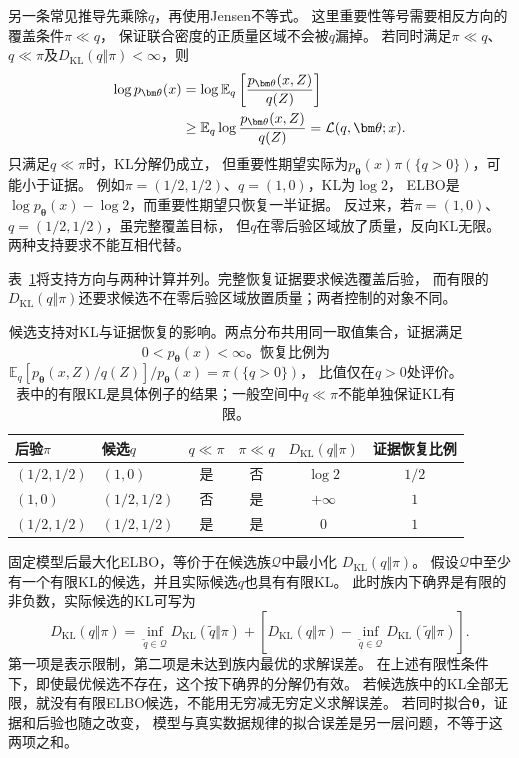另一条常见推导先乘除\(q\)，再使用Jensen不等式。
这里重要性等号需要相反方向的覆盖条件\(\pi\ll q\)，
保证联合密度的正质量区域不会被\(q\)漏掉。
若同时满足\(\pi\ll q\)、\(q\ll\pi\)及\(D_{\mathrm{KL}}(q\Vert\pi)<\infty\)，则
\begin{align}
  \log p_{\bm\theta}(x)
  &=\log\mathbb E_q\left[\frac{p_{\bm\theta}(x,Z)}{q(Z)}\right]\notag\\
  &\geq\mathbb E_q\log\frac{p_{\bm\theta}(x,Z)}{q(Z)}
   =\mathcal L(q,\bm\theta;x).
  \label{eq:information-elbo-jensen}
\end{align}
只满足\(q\ll\pi\)时，KL分解仍成立，
但重要性期望实际为\(p_{\bm\theta}(x)\pi(\{q>0\})\)，可能小于证据。
例如\(\pi=(1/2,1/2)\)、\(q=(1,0)\)，KL为\(\log2\)，
ELBO是\(\log p_{\bm\theta}(x)-\log2\)，而重要性期望只恢复一半证据。
反过来，若\(\pi=(1,0)\)、\(q=(1/2,1/2)\)，虽完整覆盖目标，
但\(q\)在零后验区域放了质量，反向KL无限。两种支持要求不能互相代替。

表~\ref{tab:information-candidate-support}将支持方向与两种计算并列。完整恢复证据要求候选覆盖后验，
而有限的\(D_{\mathrm{KL}}(q\Vert\pi)\)还要求候选不在零后验区域放置质量；两者控制的对象不同。
\begin{table}[htbp]
  \centering\small
  \begin{tabularx}{\linewidth}{XXcccc}
    \toprule
    后验\(\pi\) & 候选\(q\) & \(q\ll\pi\) & \(\pi\ll q\) & \(D_{\mathrm{KL}}(q\Vert\pi)\) & 证据恢复比例\\
    \midrule
    \((1/2,1/2)\) & \((1,0)\) & 是 & 否 & \(\log2\) & \(1/2\)\\
    \((1,0)\) & \((1/2,1/2)\) & 否 & 是 & \(+\infty\) & \(1\)\\
    \((1/2,1/2)\) & \((1/2,1/2)\) & 是 & 是 & \(0\) & \(1\)\\
    \bottomrule
  \end{tabularx}
  \caption{候选支持对KL与证据恢复的影响。两点分布共用同一取值集合，证据满足
  \(0<p_{\bm\theta}(x)<\infty\)。恢复比例为\(\mathbb E_q[p_{\bm\theta}(x,Z)/q(Z)]/p_{\bm\theta}(x)=\pi(\{q>0\})\)，
  比值仅在\(q>0\)处评价。表中的有限KL是具体例子的结果；一般空间中\(q\ll\pi\)不能单独保证KL有限。}
  \label{tab:information-candidate-support}
\end{table}

固定模型后最大化ELBO，等价于在候选族\(\mathcal Q\)中最小化
\(D_{\mathrm{KL}}(q\Vert\pi)\)。
假设\(\mathcal Q\)中至少有一个有限KL的候选，并且实际候选\(q\)也具有有限KL。
此时族内下确界是有限的非负数，实际候选的KL可写为
\[
  D_{\mathrm{KL}}(q\Vert\pi)
  =\inf_{\widetilde q\in\mathcal Q}D_{\mathrm{KL}}(\widetilde q\Vert\pi)
   +\left[D_{\mathrm{KL}}(q\Vert\pi)
    -\inf_{\widetilde q\in\mathcal Q}D_{\mathrm{KL}}(\widetilde q\Vert\pi)\right].
\]
第一项是表示限制，第二项是未达到族内最优的求解误差。
在上述有限性条件下，即使最优候选不存在，这个按下确界的分解仍有效。
若候选族中的KL全部无限，就没有有限ELBO候选，不能用无穷减无穷定义求解误差。
若同时拟合\(\bm\theta\)，证据和后验也随之改变，
模型与真实数据规律的拟合误差是另一层问题，不等于这两项之和。

